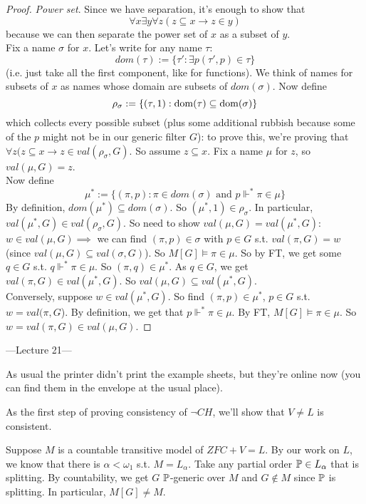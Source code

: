 \documentclass[a4paper]{article}
\begin{document}
\begin{proof}
\emph{Power set}. Since we have separation, it's enough to show that 
\[
\forall x \exists y \forall z (z \subseteq x \to z \in y)
\]
because we can then separate the power set of $x$ as a subset of $y$.\\
Fix a name $\sigma$ for $x$. Let's write for any name $\tau$:
\[
dom(\tau):=\{\tau': \exists p (\tau',p) \in \tau\}
\]
(i.e. just take all the first component, like for functions). We think of names for subsets of $x$ as names whose domain are subsets of $dom(\sigma)$. Now define
\[
\rho_\sigma:=\{(\tau,1): \dom(\tau) \subseteq \dom(\sigma)\}
\]
which collects every possible subset (plus some additional rubbish because some of the $p$ might not be in our generic filter $G$): to prove this, we're proving that $\forall z (z \subseteq x \to z \in val(\rho_\sigma,G)$. So assume $z \subseteq x$. Fix a name $\mu$ for $z$, so $val(\mu,G) = z$.\\
Now define
\[
\mu^* := \{(\pi,p):\pi \in dom(\sigma) \text{ and } p \Vdash^* \pi \in \mu\}
\]
By definition, $dom(\mu^*) \subseteq dom(\sigma)$. So $(\mu^*,1) \in \rho_\sigma$. In particular, $val(\mu^*,G) \in val(\rho_\sigma,G)$. So need to show $val(\mu,G) = val(\mu^*,G)$: $w \in val(\mu,G) \implies$ we can find $(\pi,p) \in \sigma$ with $p \in G$ s.t. $val(\pi,G) = w$ (since $val(\mu,G) \subseteq val(\sigma,G)$). So $M[G] \vDash \pi \in \mu$. So by FT, we get some $q \in G$ s.t. $q \Vdash^* \pi \in \mu$. So $(\pi,q) \in \mu^*$. As $q \in G$, we get $val(\pi,G) \in val(\mu^*,G)$. So $val(\mu,G) \subseteq val(\mu^*,G)$.\\
Conversely, suppose $w \in val(\mu^*,G)$. So find $(\pi,p) \in \mu^*$, $p \in G$ s.t. $w = val(\pi,G$). By definition, we get that $p \Vdash^* \pi \in \mu$. By FT, $M[G] \vDash \pi \in \mu$. So $w=val(\pi,G) \in val(\mu,G)$.
\end{proof}

---Lecture 21---

As usual the printer didn't print the example sheets, but they're online now (you can find them in the envelope at the usual place).

As the first step of proving consistency of $\neg CH$, we'll show that $V \neq L$ is consistent.

Suppose $M$ is a countable transitive model of $ZFC+V=L$. By our work on $L$, we know that there is $\alpha < \omega_1$ s.t. $M = L_\alpha$. Take any partial order $\P \in L_\alpha$ that is splitting. By countability, we get $G$ $\P$-generic over $M$ and $G \not\in M$ since $\P$ is splitting. In particular, $M[G] \neq M$.
\end{document}
